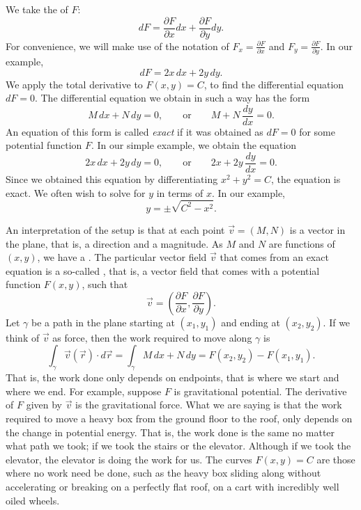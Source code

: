 We take the
\emph{} of
$F$:
\begin{equation*}
dF = \frac{\partial F}{\partial x} dx + \frac{\partial F}{\partial y} dy .
\end{equation*}
For convenience,
we will make use of the notation of
$F_x = \frac{\partial F}{\partial x}$ and
$F_y = \frac{\partial F}{\partial y}$.
In our example,
\begin{equation*}
dF = 2x \, dx + 2y \, dy .
\end{equation*}
We apply the total derivative to $F(x,y) = C$, to find
the differential equation $dF = 0$.  The differential equation we obtain in such a way
has the form
\begin{equation*}
M \, dx + N \, dy = 0, \qquad
\text{or} \qquad
M + N \, \frac{dy}{dx} = 0 .
\end{equation*}
An equation of this form
is called \emph{exact} if it was obtained as $dF = 0$ for some potential
function $F$.
In our simple example, we obtain the equation
\begin{equation*}
2x \, dx + 2y \, dy = 0, \qquad
\text{or} \qquad
2x + 2y \, \frac{dy}{dx} = 0 .
\end{equation*}
Since we obtained this equation by differentiating $x^2+y^2=C$, 
the equation is exact.
We often wish to solve for $y$ in terms of $x$.  In our example,
\begin{equation*}
y = \pm \sqrt{C^2-x^2} .
\end{equation*}

An interpretation of the setup is that at each point $\vec{v} = (M,N)$ is
a vector in the plane, that is, a direction and a magnitude.
As $M$ and $N$ are functions of $(x,y)$, we have a \emph{}.  The particular 
vector field $\vec{v}$ that comes from an exact equation is a so-called
\emph{}, that is, a vector field that comes with a
potential function $F(x,y)$, such that
\begin{equation*}
\vec{v} = \left( \frac{\partial F}{\partial x} ,\frac{\partial F}{\partial
y} \right) .
\end{equation*}
Let
$\gamma$ be a path in the plane starting at $(x_1,y_1)$ and ending at
$(x_2,y_2)$.
If we think of $\vec{v}$ as force, then the work required to
move along $\gamma$ is
\begin{equation*}
\int_\gamma \vec{v}(\vec{r}) \cdot d\vec{r}
=
\int_\gamma M \, dx + N \, dy
=
F(x_2,y_2) - F(x_1,y_1) .
\end{equation*}
That is, the work done only depends on endpoints, that is where we start and
where we end.   For example, suppose $F$ is gravitational potential.  The
derivative of $F$ given by $\vec{v}$ is the gravitational force.
What we
are saying is that the work required to move a heavy box from the ground
floor to the roof, only depends on the change in potential energy.  That is,
the work done is the same
no matter what path we took; if we took the stairs or the elevator.
Although if we took the elevator, the elevator is doing the work for us.
The curves $F(x,y) = C$ are those where no work need be done, such as
the heavy box sliding along without accelerating or breaking on a perfectly
flat roof, on a cart with incredibly well oiled wheels.

